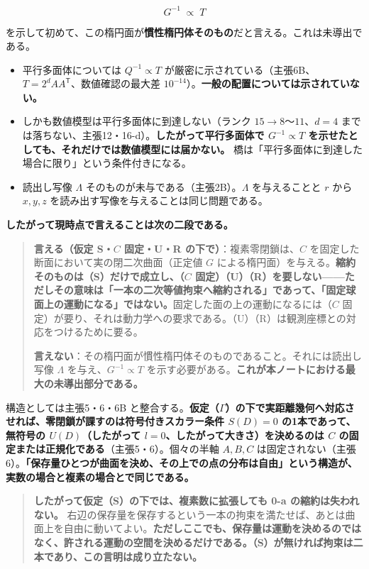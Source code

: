 \documentclass[
  10pt,
]{ltjsarticle}
\providecommand{\tightlist}{%
  \setlength{\itemsep}{0pt}\setlength{\parskip}{0pt}}
\begin{document}
\[G^{-1} \;\propto\; T\]

を示して初めて、この楕円面が\textbf{慣性楕円体そのもの}だと言える。これは未導出である。

\begin{itemize}
\tightlist
\item
  平行多面体については \(Q^{-1} \propto T\)
  が厳密に示されている（主張6B、\(T = 2^d AA^{\mathsf T}\)、数値確認の最大差
  \(10^{-14}\)）。\textbf{一般の配置については示されていない。}
\item
  しかも数値模型は平行多面体に到達しない（ランク
  \(15 \to 8\)〜\(11\)、\(d=4\)
  までは落ちない、主張12・16-d）。\textbf{したがって平行多面体で
  \(G^{-1}\propto T\)
  を示せたとしても、それだけでは数値模型には届かない。}
  橋は「平行多面体に到達した場合に限り」という条件付きになる。
\item
  読出し写像 \(\Lambda\) そのものが未与である（主張2B）。\(\Lambda\)
  を与えることと \(r\) から \(x,y,z\)
  を読み出す写像を与えることは同じ問題である。
\end{itemize}

\textbf{したがって現時点で言えることは次の二段である。}

\begin{quote}
\textbf{言える（仮定 S・\(C\) 固定・U・R の下で）}：複素零閉鎖は、\(C\)
を固定した断面において実の閉二次曲面（正定値 \(G\)
による楕円面）を与える。\textbf{縮約そのものは（S）だけで成立し、（\(C\)
固定）（U）（R）を要しない------ただしその意味は「一本の二次等値拘束へ縮約される」であって、「固定球面上の運動になる」ではない。}固定した面の上の運動になるには（\(C\)
固定）が要り、それは動力学への要求である。（U）（R）は観測座標との対応をつけるために要る。

\textbf{言えない}：その楕円面が慣性楕円体そのものであること。それには読出し写像
\(\Lambda\) を与え、\(G^{-1}\propto T\)
を示す必要がある。\textbf{これが本ノートにおける最大の未導出部分である。}
\end{quote}

構造としては主張5・6・6B
と整合する。\textbf{仮定（\(\Gamma\)）の下で実距離幾何へ対応させれば、零閉鎖が課すのは符号付きスカラー条件
\(S(D)=0\) の1本であって、無符号の \(U(D)\)（したがって
\(l=0\)、したがって大きさ）を決めるのは \(C\)
の固定または正規化である}（主張5・6）。個々の半軸 \(A, B, C\)
は固定されない（主張6）。\textbf{「保存量ひとつが曲面を決め、その上での点の分布は自由」という構造が、実数の場合と複素の場合とで同じである。}

\begin{quote}
\textbf{したがって仮定（S）の下では、複素数に拡張しても 0-a
の縮約は失われない。}
右辺の保存量を保存するという一本の拘束を満たせば、あとは曲面上を自由に動いてよい。\textbf{ただしここでも、保存量は運動を決めるのではなく、許される運動の空間を決めるだけである。（S）が無ければ拘束は二本であり、この言明は成り立たない。}
\end{quote}
\end{document}

